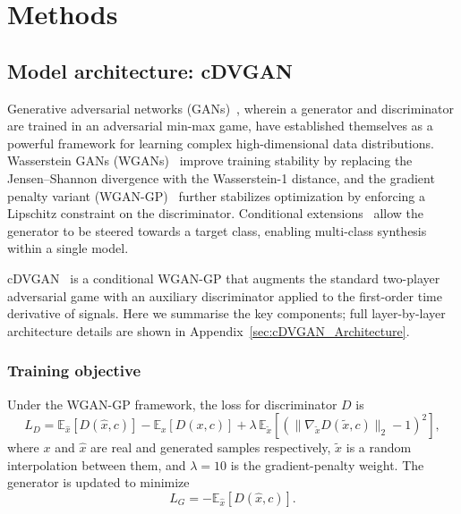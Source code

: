 \documentclass[reprint,nofootinbib,amsmath,amssymb,aps,floatfix]{revtex4-2}
\begin{document}
\section{Methods}
\label{sec:methods}

\subsection{Model architecture: cDVGAN}

Generative adversarial networks (GANs)~\cite{Goodfellow:2014upx}, wherein a generator and discriminator are trained in an adversarial min-max game, have established themselves as a powerful framework for learning complex high-dimensional data distributions.
Wasserstein GANs (WGANs)~\cite{wGAN_paper} improve training stability by replacing the Jensen--Shannon divergence with the Wasserstein-1 distance, and the gradient penalty variant (WGAN-GP)~\cite{wGAN_GP_paper} further stabilizes optimization by enforcing a Lipschitz constraint on the discriminator.
Conditional extensions~\cite{Mirza_2014} allow the generator to be steered towards a target class, enabling multi-class synthesis within a single model.

cDVGAN~\cite{cdvgan} is a conditional WGAN-GP that augments the standard two-player adversarial game with an auxiliary discriminator applied to the first-order time derivative of signals.
Here we summarise the key components; full layer-by-layer architecture details are shown in Appendix~\ref{sec:cDVGAN_Architecture}.

\subsubsection{Training objective}

Under the WGAN-GP framework, the loss for discriminator $D$ is
\begin{equation}\label{eq:discriminator_loss}
    L_D = \mathbb{E}_{\hat{x}}[D(\hat{x},c)] - \mathbb{E}_{x}[D(x,c)] + \lambda\,\mathbb{E}_{\tilde{x}}\!\left[\left(\|\nabla_{\tilde{x}} D(\tilde{x},c)\|_2 - 1\right)^2\right],
\end{equation}
where $x$ and $\hat{x}$ are real and generated samples respectively, $\tilde{x}$ is a random interpolation between them, and $\lambda = 10$ is the gradient-penalty weight.
The generator is updated to minimize
\begin{equation}
    L_G = -\mathbb{E}_{\hat{x}}[D(\hat{x},c)].
\end{equation}
\end{document}
